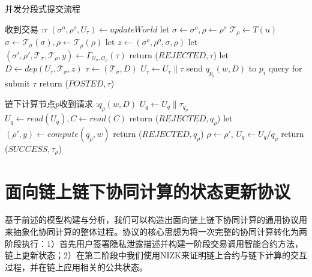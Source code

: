 \begin{breakablealgorithm}
    \caption{并发分段式提交流程}
    \label{alg:ch3-8}
    \begin{algorithmic} 
        \item[收到交易]:$\tau$
        \STATE $(\sigma^o, \rho^o, U_\tau) \leftarrow updateWorld$
        \STATE let $\sigma \leftarrow \sigma^o, \rho \leftarrow \rho^o$
        \STATE $\mathcal{T}_\rho \leftarrow T(u)$
        \STATE $\sigma \leftarrow \mathcal{T}_\sigma(\sigma), \rho \leftarrow \mathcal{T}_\rho(\rho)$
        \ENDFOR
        \STATE let $z \leftarrow (\sigma^o, \rho^o, \sigma, \rho)$
        \STATE let $(\sigma', \rho', \mathcal{T}_\sigma, \mathcal{T}_\rho, y) \leftarrow \Gamma_{\mathcal{O}_\sigma, \mathcal{O}_\rho}(\tau)$
        \STATE return ($REJECTED, \tau$)
        \ENDIF
        \STATE let $D \leftarrow dep(U_\tau, \mathcal{T}_\sigma, z)$
        \STATE $\tau \leftarrow (\mathcal{T}_\sigma, D)$
        \STATE $U_\tau \leftarrow U_\tau \parallel \tau$
        \STATE send $q_{p_i}(w, D)$ to $p_i$
        \ENDFOR
        \STATE query for submit $\tau$
        \STATE return ($POSTED, \tau$)
        \item[链下计算节点$p$收到请求]:$q_\rho(w, D)$
        \STATE $U_q \leftarrow U_q \parallel \tau_{q_\rho}$
        \REPEAT 
        \STATE $U_q \leftarrow read(U_q), C \leftarrow read(C)$
        \STATE return ($REJECTED, q_\rho$)
        \ENDIF
        \STATE let $(\rho', y) \leftarrow compute(q_\rho, w)$
        \STATE return ($REJECTED, q_\rho$)
        \ENDIF
        \STATE $\rho \leftarrow \rho'$, $U_q \leftarrow U_q / q_\rho$
        \STATE return ($SUCCESS, \tau_\rho$)
    \end{algorithmic}
\end{breakablealgorithm}

\section{面向链上链下协同计算的状态更新协议}
基于前述的模型构建与分析，我们可以构造出面向链上链下协同计算的通用协议用来抽象化协同计算的整体过程。协议的核心思想为将一次完整的协同计算转化为两阶段执行：1）首先用户签署隐私泄露描述并构建一阶段交易调用智能合约方法，链上更新状态；2）在第二阶段中我们使用NIZK来证明链上合约与链下计算的交互过程，并在链上应用相关的公共状态。

